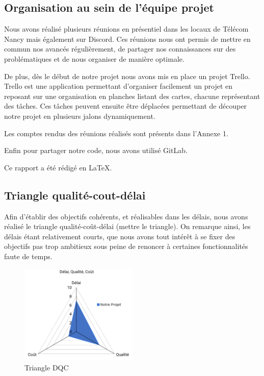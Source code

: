 \documentclass[french,a4paper]{article}
\begin{document}
\subsection{Organisation au sein de l’équipe projet}
Nous avons réalisé plusieurs réunions en présentiel dans les locaux de Télécom Nancy mais également sur Discord. Ces réunions nous ont permis de mettre en commun nos avancés régulièrement, de partager nos connaissances sur des problématiques et de nous organiser de manière optimale.

De plus, dès le début de notre projet nous avons mis en place un projet Trello. Trello est une application permettant d’organiser facilement un projet en reposant sur une organisation en planches listant des cartes, chacune représentant des tâches. Ces tâches peuvent ensuite être déplacées permettant de découper notre projet en plusieurs jalons dynamiquement.

Les comptes rendus des réunions réalisés sont présents dans l’Annexe 1.

Enfin pour partager notre code, nous avons utilisé GitLab.

Ce rapport a été rédigé en \LaTeX.

\subsection{Triangle qualité-cout-délai}
Afin d’établir des objectifs cohérents, et réalisables dans les délais, nous avons réalisé le triangle qualité-coût-délai (mettre le triangle). On remarque ainsi, les délais étant relativement courts, que nous avons tout intérêt à se fixer des objectifs pas trop ambitieux sous peine de renoncer à certaines fonctionnalités faute de temps. 

\begin{figure}[H]
    \centering
    \includegraphics[width=0.5\textwidth]{img/triangle_QCD.png}
    \caption{Triangle DQC}
\end{figure} 
\end{document}
